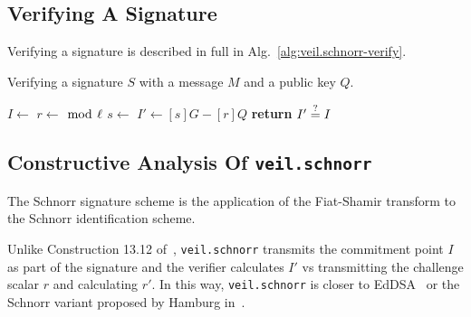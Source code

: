 \subsection{Verifying A Signature}\label{subsec:veil.schnorr-verify}

Verifying a signature is described in full in Alg.~\ref{alg:veil.schnorr-verify}.

\begin{algorithm}[!htp]
    \caption{
        Verifying a signature $S$ with a message $M$ and a public key $Q$.
    }
    \begin{algorithmic}
            \State {}
            \State {}
            \State
                \State {}
            \EndFor
            \State
            \State {}
            \State
            \State $I \gets $ 
            \State $r \gets$  $\bmod~\ell$
            \State
            \State $s \gets $ 
            \State $I' \gets [s]G - [r]Q$
            \State
            \State \textbf{return} $I' \stackrel{?}{=} I$
        \EndFunction
    \end{algorithmic}
    \label{alg:veil.schnorr-verify}
\end{algorithm}

\subsection{Constructive Analysis Of \texttt{veil.schnorr}}\label{subsec:veil.schnorr-analysis}

The Schnorr signature scheme is the application of the Fiat-Shamir transform to the Schnorr identification scheme.

Unlike Construction 13.12 of~\cite[p. 482]{katz2020}, \texttt{veil.schnorr} transmits the commitment point $I$ as part
of the signature and the verifier calculates $I'$ vs transmitting the challenge scalar $r$ and calculating $r'$.
In this way, \texttt{veil.schnorr} is closer to EdDSA~\cite{brendel2021} or the Schnorr variant proposed by Hamburg
in~\cite{hamburg2017}.

